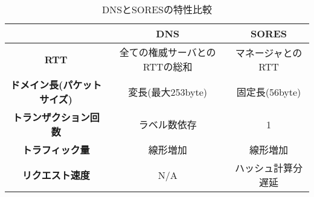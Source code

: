 \begin{table}[htb]
 \centering
  \begin{tabular}{ccc}
    \toprule
     & \textbf{DNS} & \textbf{SORES} \\
    \midrule
    \textbf{RTT} & 全ての権威サーバとのRTTの総和 & マネージャとのRTT  \\ \hline
		\textbf{ドメイン長(パケットサイズ)} & 変長(最大253byte) & 固定長(56byte)  \\ \hline
    \textbf{トランザクション回数} & ラベル数依存 & 1 \\ \hline
    \textbf{トラフィック量} & 線形増加 & 線形増加 \\ \hline
    \textbf{リクエスト速度} & N/A & ハッシュ計算分遅延 \\
    \bottomrule
  \end{tabular}
 \caption{DNSとSORESの特性比較}
 \label{tab:resource-record}
\end{table}
